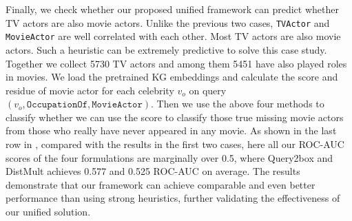 Finally, we check whether our proposed unified framework can predict whether TV actors are also movie actors. Unlike the previous two cases, \texttt{TVActor} and \texttt{MovieActor} are well correlated with each other. Most TV actors are also movie actors. Such a heuristic can be extremely predictive to solve this case study. 
Together we collect 5730 TV actors and among them 5451 have also played roles in movies.
We load the pretrained KG embeddings and calculate the score and residue of movie actor for each celebrity $v_o$ on query $(v_o, \texttt{OccupationOf}, \texttt{MovieActor})$.
Then we use the above four methods to classify whether we can use the score to classify those true missing movie actors from those who really have never appeared in any movie.
As shown in the last row in , compared with the results in the first two cases, here all our ROC-AUC scores of the four formulations are marginally over 0.5, where Query2box and DistMult achieves 0.577 and 0.525 ROC-AUC on average. 
The results demonstrate that our framework can achieve comparable and even better performance than using strong heuristics, further validating the effectiveness of our unified solution.






\fi